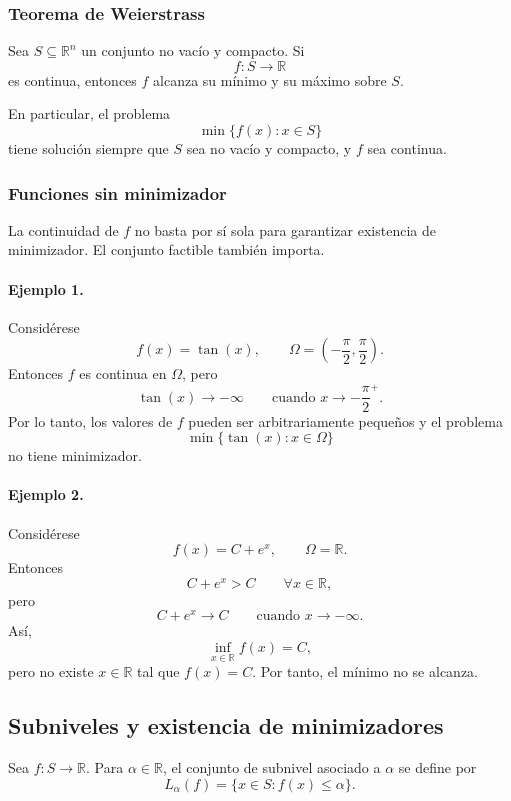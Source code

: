 \subsubsection{Teorema de Weierstrass}

\begin{theorem}[Weierstrass]
Sea \(S\subseteq\mathbb{R}^n\) un conjunto no vacío y compacto. Si
\[
    f:S\to\mathbb{R}
\]
es continua, entonces \(f\) alcanza su mínimo y su máximo sobre \(S\).
\end{theorem}

En particular, el problema
\[
    \min\{f(x):x\in S\}
\]
tiene solución siempre que \(S\) sea no vacío y compacto, y \(f\) sea continua.

\subsubsection{Funciones sin minimizador}

La continuidad de \(f\) no basta por sí sola para garantizar existencia de minimizador. El conjunto factible también importa.

\paragraph{Ejemplo 1.}
Considérese
\[
    f(x)=\tan(x),
    \qquad
    \Omega=\left(-\frac{\pi}{2},\frac{\pi}{2}\right).
\]
Entonces \(f\) es continua en \(\Omega\), pero
\[
    \tan(x)\to -\infty
    \qquad
    \text{cuando } x\to -\frac{\pi}{2}^{+}.
\]
Por lo tanto, los valores de \(f\) pueden ser arbitrariamente pequeños y el problema
\[
    \min\{\tan(x):x\in \Omega\}
\]
no tiene minimizador.

\paragraph{Ejemplo 2.}
Considérese
\[
    f(x)=C+e^x,
    \qquad
    \Omega=\mathbb{R}.
\]
Entonces
\[
    C+e^x>C
    \qquad
    \forall x\in\mathbb{R},
\]
pero
\[
    C+e^x\to C
    \qquad
    \text{cuando } x\to -\infty.
\]
Así,
\[
    \inf_{x\in\mathbb{R}} f(x)=C,
\]
pero no existe \(x\in\mathbb{R}\) tal que \(f(x)=C\). Por tanto, el mínimo no se alcanza.

\subsection{Subniveles y existencia de minimizadores}

\begin{definition}
Sea \(f:S\to\mathbb{R}\). Para \(\alpha\in\mathbb{R}\), el conjunto de subnivel asociado a \(\alpha\) se define por
\[
    L_\alpha(f)
    =
    \{x\in S:f(x)\leq \alpha\}.
\]
\end{definition}


